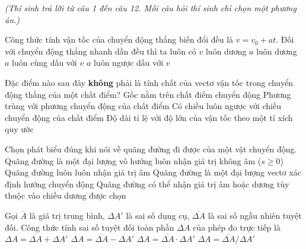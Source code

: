 
\vspace{0.15cm}
\begin{flushleft}
	{\color{blue!50!green}}
	\textit{\small (Thí sinh trả lời từ câu 1 đến câu 12. Mỗi câu hỏi thí sinh chỉ chọn một phương án.)}
\end{flushleft}
\setcounter{ex}{0}
\setcounter{bt}{0}

\begin{ex}
	Công thức tính vận tốc của chuyển động thẳng biến đổi đều là $v = v_0 + at$. Đối với chuyển động thẳng nhanh dần đều thì ta luôn có
	\choice
	{$v$ luôn dương}
	{$a$ luôn dương}
	{\True $a$ luôn cùng dấu với $v$}
	{$a$ luôn ngược dấu với $v$}
\end{ex}

\begin{ex}
	Đặc điểm nào sau đây \textbf{không} phải là tính chất của vectơ vận tốc trong chuyển động thẳng của một chất điểm?
	\choice
	{Gốc nằm trên chất điểm chuyển động}
	{Phương trùng với phương chuyển động của chất điểm}
	{\True Có chiều luôn ngược với chiều chuyển động của chất điểm}
	{Độ dài tỉ lệ với độ lớn của vận tốc theo một tỉ xích quy ước}
\end{ex}

\begin{ex}
	Chọn phát biểu đúng khi nói về quãng đường đi được của một vật chuyển động.
	\choice
	{\True Quãng đường là một đại lượng vô hướng luôn nhận giá trị không âm ($s \ge 0$)}
	{Quãng đường luôn luôn nhận giá trị âm}
	{Quãng đường là một đại lượng vectơ xác định hướng chuyển động}
	{Quãng đường có thể nhận giá trị âm hoặc dương tùy thuộc vào chiều dương được chọn}
\end{ex}

\begin{ex}
	Gọi $\overline{A}$ là giá trị trung bình, $\Delta A'$ là sai số dụng cụ, $\overline{\Delta A}$ là sai số ngẫu nhiên tuyệt đối. Công thức tính sai số tuyệt đối toàn phần $\Delta A$ của phép đo trực tiếp là
	\choice
	{\True $\Delta A = \overline{\Delta A} + \Delta A'$}
	{$\Delta A = \overline{\Delta A} - \Delta A'$}
	{$\Delta A = \overline{\Delta A} \cdot \Delta A'$}
	{$\Delta A = \overline{\Delta A} / \Delta A'$}
\end{ex}

